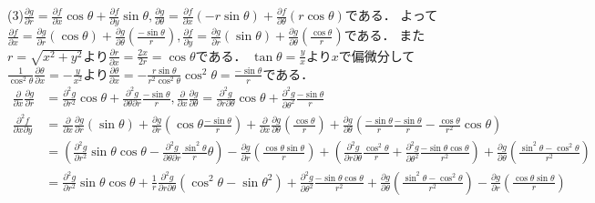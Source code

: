 \documentclass[
		book,
		head_space=20mm,
		foot_space=20mm,
		gutter=10mm,
		line_length=190mm
]{jlreq}
\begin{document}
(3)$\frac{\partial g}{\partial r}=\frac{\partial f}{\partial x}\cos \theta+\frac{\partial f}{\partial y}\sin \theta,\frac{\partial g}{\partial \theta}=\frac{\partial f}{\partial x}(-r\sin \theta)+\frac{\partial f}{\partial \theta}(r\cos \theta)$である．
よって$\frac{\partial f}{\partial x}=\frac{\partial g}{\partial r}(\cos \theta)+\frac{\partial g}{\partial \theta}(\frac{-\sin \theta}{r}),\frac{\partial f}{\partial y}=\frac{\partial g}{\partial r}(\sin \theta)+\frac{\partial g}{\partial \theta}(\frac{\cos \theta}{r})$である．
また$r=\sqrt{x^2+y^2}$より$\frac{\partial r}{\partial x}=\frac{2x}{2r}=\cos \theta$である．
$\tan \theta=\frac{y}{x}$より$x$で偏微分して$\frac{1}{\cos^2 \theta} \frac{\partial \theta}{\partial x}=-\frac{y}{x^2}$より$\frac{\partial \theta}{\partial x}=-\frac{r\sin \theta}{r^2\cos^2\theta}\cos^2\theta=\frac{-\sin \theta}{r}$である．
\begin{align}
    \frac{\partial}{\partial x}\frac{\partial g}{\partial r}&=\frac{\partial^2 g}{ \partial r^2}\cos \theta+\frac{\partial^2g}{\partial \theta \partial r}\frac{-\sin \theta}{r}
    ,\frac{\partial}{\partial x}\frac{\partial g}{\partial \theta}=\frac{\partial^2 g}{ \partial r\partial \theta}\cos \theta+\frac{\partial^2g}{\partial \theta^2}\frac{-\sin \theta}{r}\\
    \frac{\partial^2 f}{\partial x\partial y}
    &=\frac{\partial}{\partial x}\frac{\partial g}{\partial r}(\sin \theta)+\frac{\partial g}{\partial r}(\cos \theta \frac{-\sin \theta}{r})+\frac{\partial}{\partial x}\frac{\partial g}{\partial \theta}(\frac{\cos \theta}{r})+\frac{\partial g}{\partial \theta}(\frac{-\sin \theta}{r}\frac{-\sin \theta}{r}-\frac{\cos \theta}{r^2}\cos \theta)\\
    &=\left( \frac{\partial^2 g}{ \partial r^2}\sin \theta\cos \theta-\frac{\partial^2g}{\partial \theta \partial r}\frac{\sin^2 \theta}{r} \theta \right)-\frac{\partial g}{\partial r}(\frac{\cos \theta \sin \theta}{r})+\left(\frac{\partial^2 g}{ \partial r\partial \theta}\frac{\cos^2\theta}{r}+\frac{\partial^2g}{\partial \theta^2}\frac{-\sin \theta\cos \theta}{r^2}\right)+\frac{\partial g}{\partial \theta}(\frac{\sin^2 \theta-\cos^2\theta}{r^2})\\
    &=\frac{\partial^2 g}{ \partial r^2}\sin \theta\cos \theta+\frac{1}{r}\frac{\partial^2 g}{ \partial r\partial \theta}(\cos^2\theta-\sin\theta^2) +\frac{\partial^2g}{\partial \theta^2}\frac{-\sin \theta\cos \theta}{r^2}+\frac{\partial g}{\partial \theta}(\frac{\sin^2 \theta-\cos^2\theta}{r^2})-\frac{\partial g}{\partial r}(\frac{\cos \theta \sin \theta}{r})
\end{align}
\end{document}
